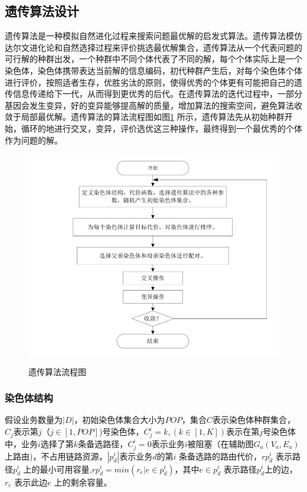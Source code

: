\subsection{遗传算法设计}
遗传算法是一种模拟自然进化过程来搜索问题最优解的启发式算法。遗传算法模仿达尔文进化论和自然选择过程来评价挑选最优解集合，遗传算法从一个代表问题的可行解的种群出发，一个种群中不同个体代表了不同的解，每个个体实际上是一个染色体，染色体携带表达当前解的信息编码，初代种群产生后，对每个染色体个体进行评价，按照适者生存，优胜劣汰的原则，使得优秀的个体更有可能把自己的遗传信息传递给下一代，从而得到更优秀的后代。在遗传算法的迭代过程中，一部分基因会发生变异，好的变异能够提高解的质量，增加算法的搜索空间，避免算法收敛于局部最优解。遗传算法的算法流程图如图\ref{IterNum} 所示，遗传算法先从初始种群开始，循环的地进行交叉，变异，评价选优这三种操作，最终得到一个最优秀的个体作为问题的解。
\begin{figure}
\setlength{\abovecaptionskip}{-0.5cm}
\begin{center}
{\includegraphics[width=0.8 \textwidth]{figures/GAprocess.pdf}}
\end{center}
\caption{{\footnotesize{遗传算法流程图}}}
\label{IterNum}
\end{figure}
\subsubsection{染色体结构}

假设业务数量为$|D|$，初始染色体集合大小为$POP$，集合$C$表示染色体种群集合，$C_j$表示第$j$（$j \in [1,POP]$)号染色体，$C^i_j=k,(k \in [1,K])$表示在第$j$号染色体中，业务$i$选择了第$k$条备选路径，$C^i_j=0$表示业务$i$被阻塞（在辅助图$G_a(V_a,E_a)$上路由)，不占用链路资源，$|p^i_d|$表示业务$d$的第$i$ 条备选路的路由代价，$rp^i_d$ 表示路径$p^i_d$ 上的最小可用容量,$rp^i_d=min(r_e|e \in p^i_d)$，其中$e \in p^i_d$ 表示路径$p^i_d$上的边，$r_e$ 表示此边$e$ 上的剩余容量。
